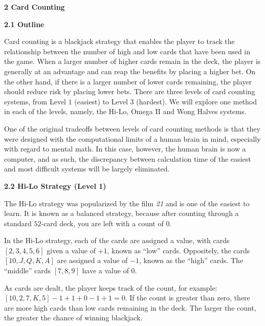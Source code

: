 \documentclass[12pt]{article}
\begin{document}
    {\large \textbf{2 Card Counting}} \newline 
    
    \textbf{2.1 Outline} \newline
    
    Card counting is a blackjack strategy that enables the player to track the relationship between the number of high and low cards that have been used in the game. When a larger number of higher cards remain in the deck, the player is generally at an advantage and can reap the benefits by placing a higher bet. On the other hand, if there is a larger number of lower cards remaining, the player should reduce risk by placing lower bets. There are three levels of card counting systems, from Level $1$ (easiest) to Level $3$ (hardest). We will explore one method in each of the levels, namely, the Hi-Lo, Omega II and Wong Halves systems. \newline

	One of the original tradeoffs between levels of card counting methods is that they were designed with the computational limits of a human brain in mind, especially with regard to mental math. In this case, however, the human brain is now a computer, and as such, the discrepancy between calculation time of the easiest and most difficult systems will be largely eliminated. \newline 

	\textbf{2.2 Hi-Lo Strategy (Level 1)} \newline 
    
    The Hi-Lo strategy was popularized by the film \textit{21} and is one of the easiest to learn. It is known as a balanced strategy, because after counting through a standard $52$-card deck, you are left with a count of $0$. \newline
    
    In the Hi-Lo strategy, each of the cards are assigned a value, with cards $[2, 3, 4, 5, 6]$ given a value of $+1$, known as ``low'' cards. Oppositely, the cards $[10, J, Q, K, A]$ are assigned a value of $-1$, known as the ``high'' cards. The ``middle'' cards $[7, 8, 9]$ have a value of 0. \newline

	As cards are dealt, the player keeps track of the count, for example: $[10, 2, 7, K, 5]  -1 + 1 + 0 - 1 + 1 = 0$. If the count is greater than zero, there are more high cards than low cards remaining in the deck. The larger the count, the greater the chance of winning blackjack. \newline 
    
\end{document}
